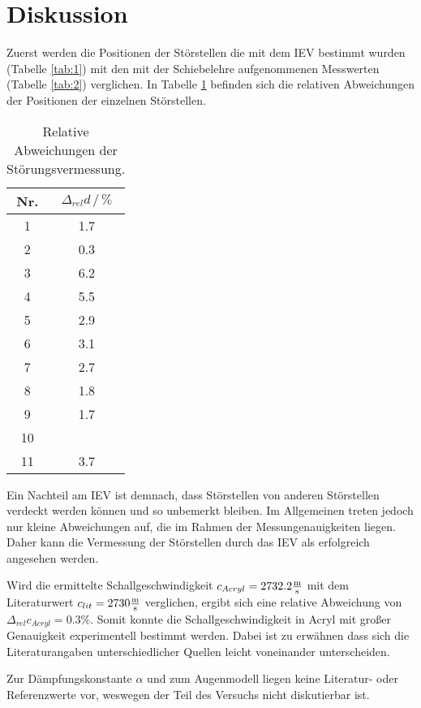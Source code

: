 \section{Diskussion}
\label{sec:Diskussion}
Zuerst werden die Positionen der Störstellen die mit dem IEV bestimmt wurden (Tabelle \ref{tab:1}) 
mit den mit der Schiebelehre aufgenommenen Messwerten (Tabelle \ref{tab:2}) verglichen.
In Tabelle \ref{tab:disk} befinden sich die relativen Abweichungen der Positionen der einzelnen Störstellen.


\begin{table}
    \centering
    \caption{Relative Abweichungen der Störungsvermessung.}
    \begin{tabular}{c c}
        \toprule
        {Nr.} & {$\Delta_{rel} d \, / \, \%$} \\
        \midrule
     1  & 1.7  \\
     2  & 0.3 \\
     3  & 6.2 \\
     4  & 5.5  \\
     5  & 2.9  \\
     6  & 3.1 \\
     7  & 2.7  \\
     8  & 1.8  \\
     9  & 1.7  \\    
     10 &       \\
     11 & 3.7 \\
        \bottomrule
    \end{tabular}
    \label{tab:disk}
\end{table}

\noindent
Ein Nachteil am IEV ist demnach, dass Störstellen von anderen Störstellen verdeckt werden können und so unbemerkt bleiben.
Im Allgemeinen treten jedoch nur kleine Abweichungen auf, die im Rahmen der Messungenauigkeiten liegen.
Daher kann die Vermessung der Störstellen durch das IEV als erfolgreich angesehen werden.

\noindent
Wird die ermittelte Schallgeschwindigkeit $c_{Acryl} = 2732.2 \si[per-mode=fraction]{\meter\per\second}$ 
mit dem Literaturwert $c_{lit} = 2730 \si[per-mode=fraction]{\meter\per\second}$ verglichen, 
ergibt sich eine relative Abweichung von $\Delta_{rel} c_{Acryl} = 0.3 \%$.
Somit konnte die Schallgeschwindigkeit in Acryl mit großer Genauigkeit experimentell bestimmt werden.
Dabei ist zu erwähnen dass sich die Literaturangaben unterschiedlicher Quellen leicht voneinander unterscheiden.

\noindent
Zur Dämpfungskonstante $\alpha$ und zum Augenmodell liegen keine Literatur- oder Referenzwerte vor, 
weswegen der Teil des Versuchs nicht diskutierbar ist.